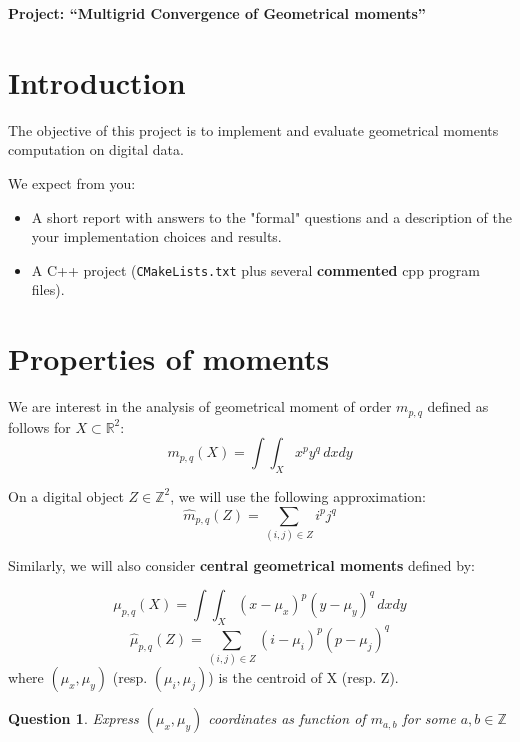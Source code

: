 \documentclass[a4paper, 11pt]{article}
\title{}
\author{}
\date{}
\newtheorem{qu}{Question}
\begin{document}
\begin{center}
	\LARGE \textbf{Project: ``Multigrid Convergence of Geometrical moments''}
\end{center}

\section*{Introduction}

The objective of this project is to implement and evaluate geometrical
moments computation on digital data.


We expect from you:
\begin{itemize}
\item A short report with answers to the "formal" questions and a
  description of the your implementation choices and results.
\item A C++ project (\texttt{CMakeLists.txt} plus several
  \textbf{commented} cpp program files).
\end{itemize}


\section{Properties of moments}
We are interest in the analysis of geometrical moment of order
$m_{p,q}$ defined as follows for $X\subset\mathbb{R}^2$:
\begin{displaymath}
 m_{p,q}(X) = \int\int_X x^py^q\,dxdy
\end{displaymath}

On a digital object $Z\in\mathbb{Z}^2$, we will use the following approximation:
\begin{displaymath}
\hat{m}_{p,q}(Z) = \sum_{(i,j)\in Z} i^pj^q
\end{displaymath} 

Similarly, we will also consider {\bf central geometrical moments} defined by:

\begin{displaymath}
 \mu_{p,q}(X) = \int\int_X (x-\mu_x)^p(y-\mu_y)^q\,dxdy
\end{displaymath}
\begin{displaymath}
 \hat{\mu}_{p,q}(Z) =  \sum_{(i,j)\in Z} (i-\mu_i)^p(p-\mu_j)^q
\end{displaymath}
where $(\mu_x,\mu_y)$ (resp. $(\mu_i,\mu_j)$) is the centroid of X (resp. Z).

\begin{qu}
 Express $(\mu_x,\mu_y)$ coordinates as function of $m_{a,b}$ for some $a,b\in\mathbb{Z}$
\end{qu}
\end{document}
